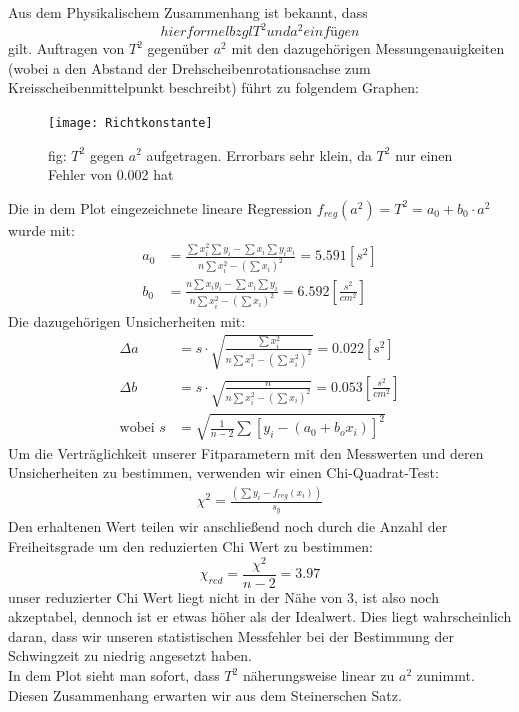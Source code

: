 \documentclass[11pt,a4paper]{article}
\begin{document}
	
	Aus dem Physikalischem Zusammenhang ist bekannt, dass
	\begin{equation}
	hier formel bzgl T^2 und a^2 einfügen
	\end{equation}
	gilt.
	Auftragen von $T^2$ gegenüber $a^2$ mit den dazugehörigen Messungenauigkeiten (wobei a den Abstand der Drehscheibenrotationsachse zum Kreisscheibenmittelpunkt beschreibt) führt zu folgendem Graphen:\\
	\begin{figure}[H]
	\texttt{[image: Richtkonstante]}
	\caption[]{fig: $T^2$ gegen $a^2$ aufgetragen. Errorbars sehr klein, da $T^2$ nur einen Fehler von 0.002 hat}
	\end{figure}
	Die in dem Plot eingezeichnete lineare Regression $f_{reg}(a^2)=T^2=a_0 + b_0 \cdot a^2$ wurde mit:
	\begin{align}
	a_0 &= \frac{\sum x_i^2 \sum y_i -\sum x_i \sum y_i x_i}{n\sum x_i^2 -(\sum x_i)^2}=5.591[s^2]\\ 
	b_0 &= \frac{n \sum x_i y_i - \sum x_i \sum y_i}{n \sum x_i^2 - (\sum x_i)^2}=6.592 [\frac{s^2}{cm^2}]
	\end{align}
	Die dazugehörigen Unsicherheiten mit:
	\begin{align}
	\Delta a &= s \cdot \sqrt{\frac{\sum x_i^2}{n \sum x_i^2 - (\sum x_i^2)^2}}=0.022[s^2]\\
	\Delta b &= s \cdot \sqrt{\frac{n}{n \sum x_i^2 - (\sum x_i)^2}}=0.053[\frac{s^2}{cm^2}]\\
	 \text{wobei  } s&=\sqrt{\frac{1}{n-2} \sum [y_i -( a_0 + b_o x_i)]^2}
	\end{align}
	Um die Verträglichkeit unserer Fitparametern mit den Messwerten und deren Unsicherheiten zu bestimmen,
	verwenden wir einen Chi-Quadrat-Test:
	\begin{align}
	\chi ^2 = \frac{(\sum y_i - f_{reg}(x_i))}{s_y}
	\end{align}
	Den erhaltenen Wert teilen wir anschließend noch durch die Anzahl der Freiheitsgrade um den reduzierten Chi Wert zu bestimmen:
	$$\chi _{red} = \frac{\chi ^2 }{n-2} =3.97$$
	unser reduzierter Chi Wert liegt nicht in der Nähe von 3, ist also noch akzeptabel, dennoch ist er etwas höher als der Idealwert.
	Dies liegt wahrscheinlich daran, dass wir unseren statistischen Messfehler bei der Bestimmung der Schwingzeit zu niedrig angesetzt haben.\vspace{2cm}\\
	In dem Plot sieht man sofort, dass $T^2$ näherungsweise linear zu $a^2$ zunimmt. Diesen Zusammenhang erwarten wir aus dem Steinerschen Satz.
	\\
	
\end{document}
